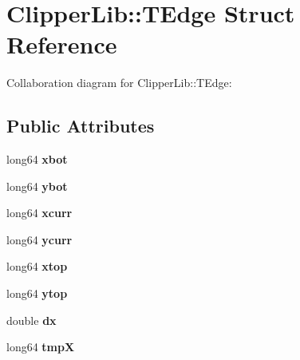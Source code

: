 \hypertarget{struct_clipper_lib_1_1_t_edge}{\section{Clipper\+Lib\+:\+:T\+Edge Struct Reference}
\label{struct_clipper_lib_1_1_t_edge}
}


Collaboration diagram for Clipper\+Lib\+:\+:T\+Edge\+:
\subsection*{Public Attributes}
\begin{DoxyCompactItemize}
\item 
\hypertarget{struct_clipper_lib_1_1_t_edge_a42d3306a851df6869a85f68495a1c4a3}{long64 {\bfseries xbot}}\label{struct_clipper_lib_1_1_t_edge_a42d3306a851df6869a85f68495a1c4a3}

\item 
\hypertarget{struct_clipper_lib_1_1_t_edge_a5cca9ccc325b346dc2a25001c4291f2a}{long64 {\bfseries ybot}}\label{struct_clipper_lib_1_1_t_edge_a5cca9ccc325b346dc2a25001c4291f2a}

\item 
\hypertarget{struct_clipper_lib_1_1_t_edge_a26717c33477dbe350518cd0819a9e3c6}{long64 {\bfseries xcurr}}\label{struct_clipper_lib_1_1_t_edge_a26717c33477dbe350518cd0819a9e3c6}

\item 
\hypertarget{struct_clipper_lib_1_1_t_edge_a075c45d9ae5c1d2d0a22a4778c2f7c74}{long64 {\bfseries ycurr}}\label{struct_clipper_lib_1_1_t_edge_a075c45d9ae5c1d2d0a22a4778c2f7c74}

\item 
\hypertarget{struct_clipper_lib_1_1_t_edge_ad171f585c0d88630f35fc87706ae1fde}{long64 {\bfseries xtop}}\label{struct_clipper_lib_1_1_t_edge_ad171f585c0d88630f35fc87706ae1fde}

\item 
\hypertarget{struct_clipper_lib_1_1_t_edge_a56b854b6224c1f0fc7903d5448229a3a}{long64 {\bfseries ytop}}\label{struct_clipper_lib_1_1_t_edge_a56b854b6224c1f0fc7903d5448229a3a}

\item 
\hypertarget{struct_clipper_lib_1_1_t_edge_aab44ea427e3da1631c15e1ff7c913108}{double {\bfseries dx}}\label{struct_clipper_lib_1_1_t_edge_aab44ea427e3da1631c15e1ff7c913108}

\item 
\hypertarget{struct_clipper_lib_1_1_t_edge_a4ec20b0f419c70c81d57d3e1da27daf6}{long64 {\bfseries tmp\+X}}\label{struct_clipper_lib_1_1_t_edge_a4ec20b0f419c70c81d57d3e1da27daf6}


\end{DoxyCompactItemize}
